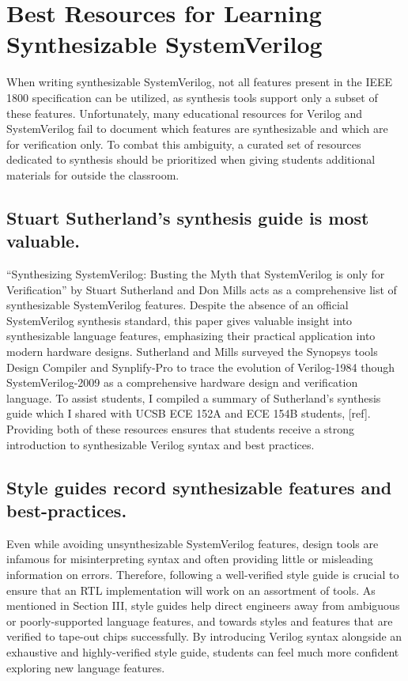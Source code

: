 
\chapter{Best Resources for Learning Synthesizable SystemVerilog}
\label{chapter:resources}

When writing synthesizable SystemVerilog, not all features present in the IEEE 1800 specification can be utilized, as synthesis tools support only a subset of these features. Unfortunately, many educational resources for Verilog and SystemVerilog fail to document which features are synthesizable and which are for verification only. To combat this ambiguity, a curated set of resources dedicated to synthesis should be prioritized when giving students additional materials for outside the classroom.

\section{Stuart Sutherland's synthesis guide is most valuable.}

``Synthesizing SystemVerilog: Busting the Myth that SystemVerilog is only for Verification'' by Stuart Sutherland and Don Mills acts as a comprehensive list of synthesizable SystemVerilog features. Despite the absence of an official SystemVerilog synthesis standard, this paper gives valuable insight into synthesizable language features, emphasizing their practical application into modern hardware designs. Sutherland and Mills surveyed the Synopsys tools Design Compiler and Synplify-Pro to trace the evolution of Verilog-1984 though SystemVerilog-2009 as a comprehensive hardware design and verification language. To assist students, I compiled a summary of Sutherland's synthesis guide which I shared with UCSB ECE 152A and ECE 154B students, [ref]. Providing both of these resources ensures that students receive a strong introduction to synthesizable Verilog syntax and best practices.

\section{Style guides record synthesizable features and best-practices.}

Even while avoiding unsynthesizable SystemVerilog features, design tools are infamous for misinterpreting syntax and often providing little or misleading information on errors. Therefore, following a well-verified style guide is crucial to ensure that an RTL implementation will work on an assortment of tools. As mentioned in Section III, style guides help direct engineers away from ambiguous or poorly-supported language features, and towards styles and features that are verified to tape-out chips successfully. By introducing Verilog syntax alongside an exhaustive and highly-verified style guide, students can feel much more confident exploring new language features.

